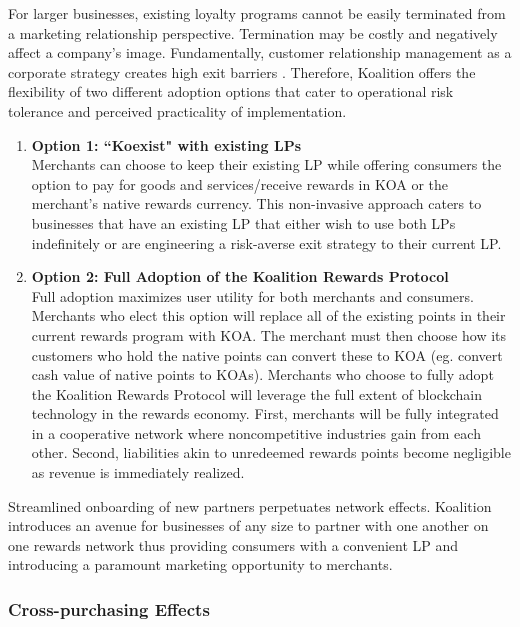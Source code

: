 For larger businesses, existing loyalty programs cannot be easily terminated from a marketing relationship perspective. Termination may be costly and negatively affect a company's image. Fundamentally, customer relationship management as a corporate strategy creates high exit barriers \cite{Rehnen16}. Therefore, Koalition offers the flexibility of two different adoption options that cater to operational risk tolerance and perceived practicality of implementation.  


\begin{enumerate}
\item \textbf{Option 1: ``Koexist" with existing LPs} \\
Merchants can choose to keep their existing LP while offering consumers the option to pay for goods and services/receive rewards in KOA or the merchant's native rewards currency. This non-invasive approach caters to businesses that have an existing LP that either wish to use both LPs indefinitely or are engineering a risk-averse exit strategy to their current LP.

\item \textbf{Option 2: Full Adoption of the Koalition Rewards Protocol} \\
Full adoption maximizes user utility for both merchants and consumers. Merchants who elect this option will replace all of the existing points in their current rewards program with KOA. The merchant must then choose how its customers who hold the native points can convert these to KOA (eg. convert cash value of native points to KOAs). Merchants who choose to fully adopt the Koalition Rewards Protocol will leverage the full extent of blockchain technology in the rewards economy. First, merchants will be fully integrated in a cooperative network where noncompetitive industries gain from each other. Second, liabilities akin to unredeemed rewards points become negligible as revenue is immediately realized.
\end{enumerate}

Streamlined onboarding of new partners perpetuates network effects. Koalition introduces an avenue for businesses of any size to partner with one another on one rewards network thus providing consumers with a convenient LP and introducing a paramount marketing opportunity to merchants. 

\subsubsection{Cross-purchasing Effects}

